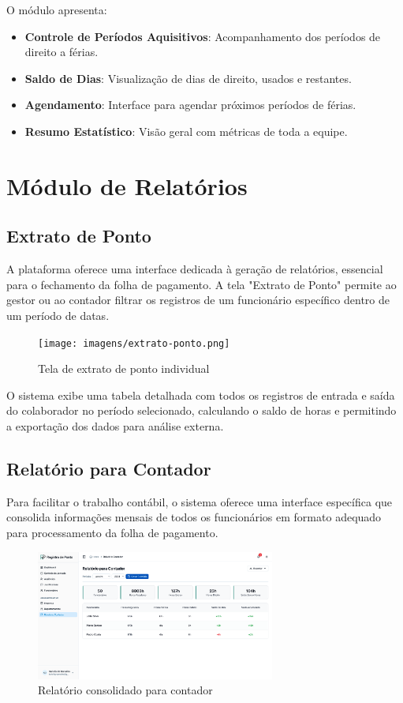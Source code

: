 O módulo apresenta:

\begin{itemize}
\item \textbf{Controle de Períodos Aquisitivos}: Acompanhamento dos períodos de direito a férias.
\item \textbf{Saldo de Dias}: Visualização de dias de direito, usados e restantes.
\item \textbf{Agendamento}: Interface para agendar próximos períodos de férias.
\item \textbf{Resumo Estatístico}: Visão geral com métricas de toda a equipe.
\end{itemize}

\section{Módulo de Relatórios}

\subsection{Extrato de Ponto}

A plataforma oferece uma interface dedicada à geração de relatórios, essencial para o fechamento da folha de pagamento. A tela "Extrato de Ponto" permite ao gestor ou ao contador filtrar os registros de um funcionário específico dentro de um período de datas.

\begin{figure}[H]
\centering
\texttt{[image: imagens/extrato-ponto.png]}
\caption{Tela de extrato de ponto individual}
\label{fig:extrato-ponto}
\end{figure}

O sistema exibe uma tabela detalhada com todos os registros de entrada e saída do colaborador no período selecionado, calculando o saldo de horas e permitindo a exportação dos dados para análise externa.

\subsection{Relatório para Contador}

Para facilitar o trabalho contábil, o sistema oferece uma interface específica que consolida informações mensais de todos os funcionários em formato adequado para processamento da folha de pagamento.

\begin{figure}[H]
\centering
\includegraphics[width=0.7\textwidth]{imagens/relatorio-contador.png}
\caption{Relatório consolidado para contador}
\label{fig:relatorio-contador}
\end{figure}

